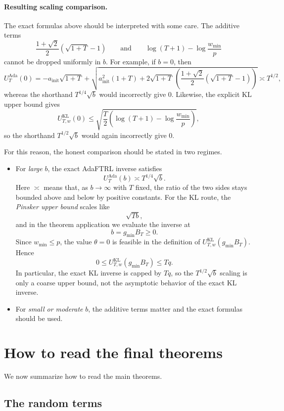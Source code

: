 \documentclass[11pt]{article}
\newcommand{\1}{\mathbf{1}}
\begin{document}
\paragraph{Resulting scaling comparison.}
The exact formulas above should be interpreted with some care. The additive terms
\[
\frac{1+\sqrt{2}}{2}(\sqrt{1+T}-1)
\qquad\text{and}\qquad
\log(T+1)-\log\frac{w_{\min}}{p}
\]
cannot be dropped uniformly in \(b\). For example, if \(b=0\), then
\[
U_T^{\mathrm{Ada}}(0)
=
-a_{\mathrm{init}}\sqrt{1+T}
+
\sqrt{
a_{\mathrm{init}}^2(1+T)
+
2\sqrt{1+T}\,(\frac{1+\sqrt{2}}{2}(\sqrt{1+T}-1))
}
\asymp T^{1/2},
\]
whereas the shorthand \(T^{1/4}\sqrt{b}\) would incorrectly give \(0\). Likewise, the explicit KL upper bound gives
\[
U_{T,w}^{\mathrm{KL}}(0)
\le
\sqrt{\frac{T}{2}\left(\log(T+1)-\log\frac{w_{\min}}{p}\right)},
\]
so the shorthand \(T^{1/2}\sqrt{b}\) would again incorrectly give \(0\).

For this reason, the honest comparison should be stated in two regimes.

\begin{itemize}[leftmargin=*,itemsep=2pt]
  \item For \emph{large} \(b\), the exact AdaFTRL inverse satisfies
  \[
  U_T^{\mathrm{Ada}}(b)\asymp T^{1/4}\sqrt{b}.
  \]
  Here \(\asymp\) means that, as \(b\to\infty\) with \(T\) fixed, the ratio of the two sides stays bounded above and below by positive constants. For the KL route, the \emph{Pinsker upper bound} scales like
  \[
  \sqrt{Tb},
  \]
  and in the theorem application we evaluate the inverse at
  \[
  b=g_{\min}B_T\ge 0.
  \]
  Since \(w_{\min}\le p\), the value \(\theta=0\) is feasible in the definition of \(U_{T,w}^{\mathrm{KL}}(g_{\min}B_T)\). Hence
  \[
  0\le U_{T,w}^{\mathrm{KL}}(g_{\min}B_T)\le Tq.
  \]
  In particular, the exact KL inverse is capped by \(Tq\), so the \(T^{1/2}\sqrt b\) scaling is only a coarse upper bound, not the asymptotic behavior of the exact KL inverse.
  \item For \emph{small or moderate} \(b\), the additive terms matter and the exact formulas should be used.
\end{itemize}

\section{How to read the final theorems}

We now summarize how to read the main theorems.

\subsection{The random terms}
\end{document}
